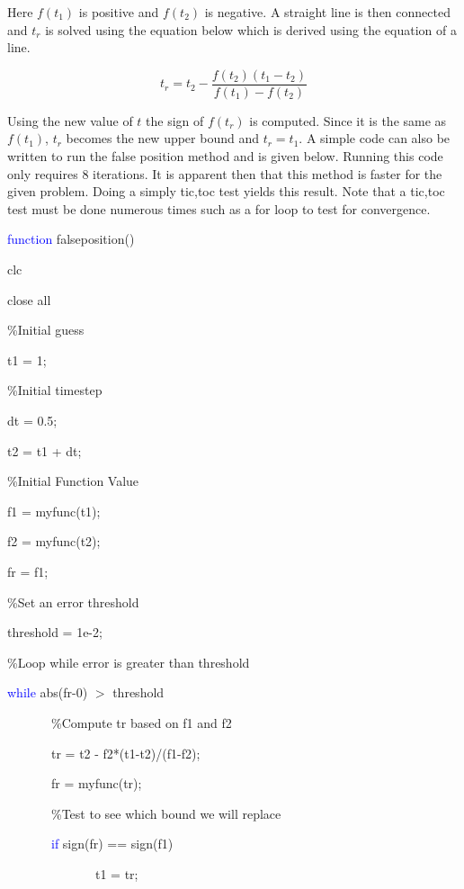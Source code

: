 \begin{enumerate}
Here $f(t_1)$ is positive and $f(t_2)$ is negative. A straight line
is then connected and $t_r$ is solved using the equation below which
is derived using the equation of a line.

\begin{equation} 
t_r = t_2 - \frac{f(t_2)(t_1-t_2)}{f(t_1)-f(t_2)}
\end{equation}

Using the new value of $t$ the sign of $f(t_r)$ is computed. Since it
is the same as $f(t_1)$, $t_r$ becomes the new upper bound and
$t_r=t_1$. A simple code can also be written to run the false position
method and is given below. Running this code only requires 8
iterations. It is apparent then that this method is faster for the
given problem. Doing a simply tic,toc test yields this result. Note
that a tic,toc test must be done numerous times such as a for loop to
test for convergence. 

\begin{framed}
\textcolor{blue}{function} falseposition()

clc

close all

\textcolor{OliveGreen}{\%Initial guess}

t1 = 1;

\textcolor{OliveGreen}{\%Initial timestep}

dt = 0.5;

t2 = t1 + dt;

\textcolor{OliveGreen}{\%Initial Function Value}

f1 = myfunc(t1);

f2 = myfunc(t2);

fr = f1;

\textcolor{OliveGreen}{\%Set an error threshold}

threshold = 1e-2;

\textcolor{OliveGreen}{\%Loop while error is greater than threshold}

\textcolor{blue}{while} abs(fr-0) $>$ threshold

~~~~~~~\textcolor{OliveGreen}{\%Compute tr based on f1 and f2}

~~~~~~~tr = t2 - f2*(t1-t2)/(f1-f2);

~~~~~~~fr = myfunc(tr);

~~~~~~~\textcolor{OliveGreen}{\%Test to see which bound we will replace}

~~~~~~~\textcolor{blue}{if} sign(fr) == sign(f1)

~~~~~~~~~~~~~~t1 = tr;


\end{framed}
\end{enumerate}
